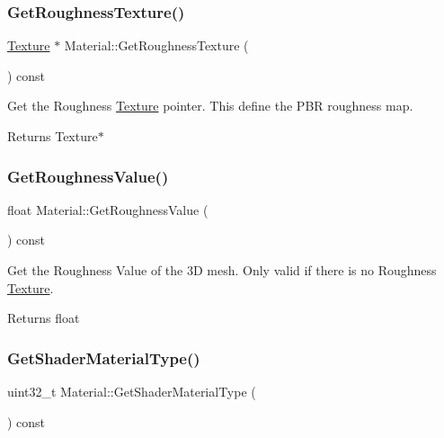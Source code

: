 \subsubsection{\texorpdfstring{Get\+Roughness\+Texture()}{GetRoughnessTexture()}}
{\footnotesize\ttfamily \hyperlink{classTexture}{Texture} $\ast$ Material\+::\+Get\+Roughness\+Texture (\begin{DoxyParamCaption}{ }\end{DoxyParamCaption}) const}



Get the Roughness \hyperlink{classTexture}{Texture} pointer. This define the P\+BR roughness map. 

\begin{DoxyReturn}{Returns}
Texture$\ast$ 
\end{DoxyReturn}
\mbox{\label{classMaterial_a83d88169ada8d6094df872c1a0d82765}} 
\subsubsection{\texorpdfstring{Get\+Roughness\+Value()}{GetRoughnessValue()}}
{\footnotesize\ttfamily float Material\+::\+Get\+Roughness\+Value (\begin{DoxyParamCaption}{ }\end{DoxyParamCaption}) const}



Get the Roughness Value of the 3D mesh. Only valid if there is no Roughness \hyperlink{classTexture}{Texture}. 

\begin{DoxyReturn}{Returns}
float 
\end{DoxyReturn}
\mbox{\label{classMaterial_a22f3cbf6ae1a551a73138673f8c019f2}} 
\subsubsection{\texorpdfstring{Get\+Shader\+Material\+Type()}{GetShaderMaterialType()}}
{\footnotesize\ttfamily uint32\+\_\+t Material\+::\+Get\+Shader\+Material\+Type (\begin{DoxyParamCaption}{ }\end{DoxyParamCaption}) const}



